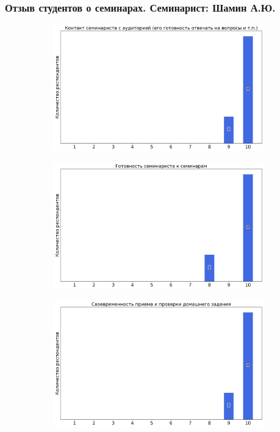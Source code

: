 	\subsubsection{Отзыв студентов о семинарах. Семинарист: Шамин А.Ю.}
		\begin{figure}[H]
			\centering
			\begin{subfigure}[b]{0.45\textwidth}
				\centering
				\includegraphics[width=\textwidth]{images/1 course/Математический анализ/seminarists-marks-Шамин А.Ю.-0.png}
			\end{subfigure}
			\begin{subfigure}[b]{0.45\textwidth}
				\centering
				\includegraphics[width=\textwidth]{images/1 course/Математический анализ/seminarists-marks-Шамин А.Ю.-1.png}
			\end{subfigure}
			\begin{subfigure}[b]{0.45\textwidth}
				\centering
				\includegraphics[width=\textwidth]{images/1 course/Математический анализ/seminarists-marks-Шамин А.Ю.-2.png}

\end{subfigure}
\end{figure}
